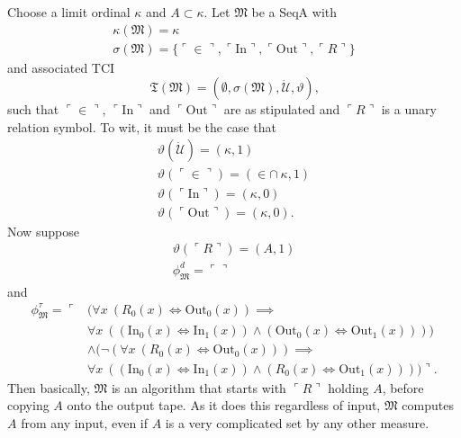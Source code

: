 \documentclass[12pt]{article}
\numberwithin{equation}{section}
\begin{document}
\begin{ex}\label{ex217}
Choose a limit ordinal $\kappa$ and $A \subset \kappa$. Let $\mathfrak{M}$ be a SeqA with 
\begin{gather*}
    \kappa(\mathfrak{M}) = \kappa \\
    \sigma(\mathfrak{M}) = \{\ulcorner \in \urcorner, \ulcorner \mathrm{In} \urcorner, \ulcorner \mathrm{Out} \urcorner, \ulcorner R \urcorner\}
\end{gather*} 
and associated TCI 
\begin{equation*}
    \mathfrak{T}(\mathfrak{M}) = (\emptyset, \sigma(\mathfrak{M}), \dot{\mathcal{U}}, \vartheta) \text{,}
\end{equation*} 
such that $\ulcorner \in \urcorner$, $\ulcorner \mathrm{In} \urcorner$ and $\ulcorner \mathrm{Out} \urcorner$ are as stipulated and $\ulcorner R \urcorner$ is a unary relation symbol. To wit, it must be the case that
\begin{gather*}
    \vartheta(\dot{\mathcal{U}}) = (\kappa, 1) \\
    \vartheta(\ulcorner \in \urcorner) = (\in \cap \ \kappa, 1) \\
    \vartheta(\ulcorner \mathrm{In} \urcorner) = (\kappa, 0) \\
    \vartheta(\ulcorner \mathrm{Out} \urcorner) = (\kappa, 0) \text{.}
\end{gather*}
Now suppose
\begin{gather*}
    \vartheta(\ulcorner R \urcorner) = (A, 1) \\
    \phi^d_{\mathfrak{M}} = \ulcorner \urcorner
\end{gather*}
and
\begin{align*}
    \phi^{\tau}_{\mathfrak{M}} = \ulcorner & (\forall x \ (R_0(x) \iff \mathrm{Out}_0(x)) \implies \\
    & \forall x \ ((\mathrm{In}_0(x) \iff \mathrm{In}_1(x)) \wedge (\mathrm{Out}_0(x) \iff \mathrm{Out}_1(x)))) \\
    & \wedge (\neg (\forall x \ (R_0(x) \iff \mathrm{Out}_0(x))) \implies \\
    & \forall x \ ((\mathrm{In}_0(x) \iff \mathrm{In}_1(x)) \wedge (R_0(x) \iff \mathrm{Out}_1(x)))) \urcorner \text{.}
\end{align*}
Then basically, $\mathfrak{M}$ is an algorithm that starts with $\ulcorner R \urcorner$ holding $A$, before copying $A$ onto the output tape. As it does this regardless of input, $\mathfrak{M}$ computes $A$ from any input, even if $A$ is a very complicated set by any other measure.
\end{ex}
\end{document}
